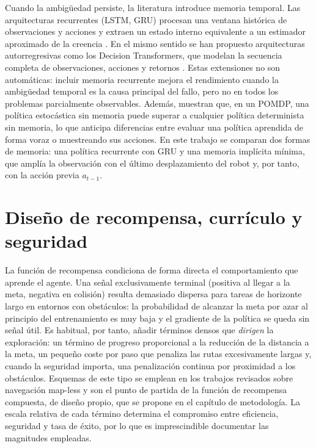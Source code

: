 Cuando la ambigüedad persiste, la literatura introduce memoria temporal.
Las arquitecturas recurrentes (LSTM, GRU) procesan una ventana histórica
de observaciones y acciones y extraen un estado interno equivalente a un
estimador aproximado de la creencia \citep{mienye2024recurrent}. En el
mismo sentido se han propuesto arquitecturas autorregresivas como los
Decision Transformers, que modelan la secuencia completa de observaciones,
acciones y retornos \citep{ge2024deep}. Estas extensiones no son
automáticas: incluir memoria recurrente mejora el rendimiento cuando la
ambigüedad temporal es la causa principal del fallo, pero no en todos los
problemas parcialmente observables. Además, \citet{singh1994learning}
muestran que, en un POMDP, una política estocástica sin memoria puede
superar a cualquier política determinista sin memoria, lo que anticipa
diferencias entre evaluar una política aprendida de forma voraz o
muestreando sus acciones. En este trabajo se comparan dos formas de
memoria: una política recurrente con GRU y una memoria implícita mínima,
que amplía la observación con el último desplazamiento del robot y, por
tanto, con la acción previa $a_{t-1}$.

\section{Diseño de recompensa, currículo y seguridad}
La función de recompensa condiciona de forma directa el comportamiento que
aprende el agente. Una señal exclusivamente terminal (positiva al llegar a
la meta, negativa en colisión) resulta demasiado dispersa para tareas de
horizonte largo en entornos con obstáculos: la probabilidad de alcanzar la
meta por azar al principio del entrenamiento es muy baja y el gradiente de
la política se queda sin señal útil. Es habitual, por tanto, añadir
términos densos que \textit{dirigen} la exploración: un término de
progreso proporcional a la reducción de la distancia a la meta, un pequeño
coste por paso que penaliza las rutas excesivamente largas y, cuando la
seguridad importa, una penalización continua por proximidad a los
obstáculos. Esquemas de este tipo se emplean en los trabajos revisados
sobre navegación map-less \citep{gao2025hierarchical,guo2025map,xue2022using}
y son el punto de partida de la función de recompensa compuesta, de
diseño propio, que se propone en el capítulo de metodología. La escala relativa de cada término determina el
compromiso entre eficiencia, seguridad y tasa de éxito, por lo que es
imprescindible documentar las magnitudes empleadas.

